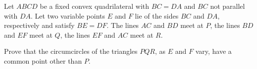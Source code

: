 Let $ABCD$ be a fixed convex quadrilateral with $BC=DA$ and $BC$ not parallel with $DA$. Let two variable points $E$ and $F$ lie of the sides $BC$ and $DA$,  respectively and satisfy $BE=DF$. The lines $AC$ and $BD$ meet at $P$,  the lines $BD$ and $EF$ meet at $Q$,  the lines $EF$ and $AC$ meet at $R$.

Prove that the circumcircles of the triangles $PQR$,  as $E$ and $F$ vary, have a common point other than $P$.